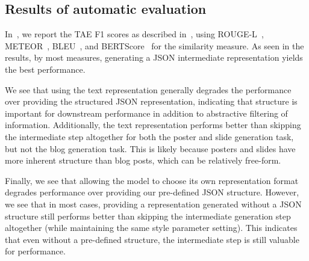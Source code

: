 \subsection{Results of automatic evaluation}\label{sec:auto-results}

In~, we report the TAE F1 scores as described in~, using ROUGE-L~\cite{lin2004rouge}, METEOR~\cite{banerjee2005meteor}, BLEU~\cite{papineni2002bleu}, and BERTScore~\cite{zhang2020bertscore} for the similarity measure. As seen in the results, by most measures, generating a JSON intermediate representation yields the best performance. 

We see that using the text representation generally degrades the performance over providing the structured JSON representation, indicating that structure is important for downstream performance in addition to abstractive filtering of information. Additionally, the text representation performs better than skipping the intermediate step altogether for both the poster and slide generation task, but not the blog generation task. This is likely because posters and slides have more inherent structure than blog posts, which can be relatively free-form.

Finally, we see that allowing the model to choose its own representation format degrades performance over providing our pre-defined JSON structure. However, we see that in most cases, providing a representation generated without a JSON structure still performs better than skipping the intermediate generation step altogether (while maintaining the same style parameter setting). This indicates that even without a pre-defined structure, the intermediate step is still valuable for performance. 



